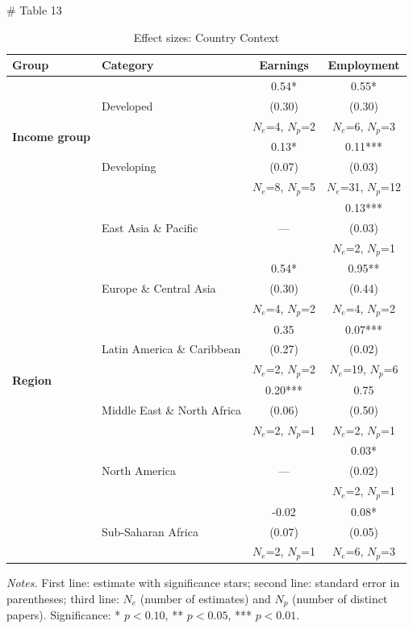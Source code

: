 # Table 13

\renewcommand{\arraystretch}{0.9} %
\setlength{\tabcolsep}{5pt}       %
\small                            %

\begin{table}[htbp]
\centering
\caption{Effect sizes: Country Context}
\medskip
\begin{tabular*}{\linewidth}{@{\extracolsep{\fill}} l l c c @{}}
\toprule
\textbf{Group} & \textbf{Category} & \textbf{Earnings} & \textbf{Employment} \\
\midrule
\multirow{6}{*}{\textbf{Income group}}
  &  & 0.54* & 0.55* \\
  & Developed & (0.30) & (0.30) \\
  &  & $N_e$=4, $N_p$=2 & $N_e$=6, $N_p$=3 \\
\cmidrule(lr){2-4}
  &  & 0.13* & 0.11*** \\
  & Developing & (0.07) & (0.03) \\
  &  & $N_e$=8, $N_p$=5 & $N_e$=31, $N_p$=12 \\
\midrule
\multirow{18}{*}{\textbf{Region}}
  &  &  & 0.13*** \\
  & East Asia \& Pacific & --- & (0.03) \\
  &  &  & $N_e$=2, $N_p$=1 \\
\cmidrule(lr){2-4}
  &  & 0.54* & 0.95** \\
  & Europe \& Central Asia & (0.30) & (0.44) \\
  &  & $N_e$=4, $N_p$=2 & $N_e$=4, $N_p$=2 \\
\cmidrule(lr){2-4}
  &  & 0.35 & 0.07*** \\
  & Latin America \& Caribbean & (0.27) & (0.02) \\
  &  & $N_e$=2, $N_p$=2 & $N_e$=19, $N_p$=6 \\
\cmidrule(lr){2-4}
  &  & 0.20*** & 0.75 \\
  & Middle East \& North Africa & (0.06) & (0.50) \\
  &  & $N_e$=2, $N_p$=1 & $N_e$=2, $N_p$=1 \\
\cmidrule(lr){2-4}
  &  &  & 0.03* \\
  & North America & --- & (0.02) \\
  &  &  & $N_e$=2, $N_p$=1 \\
\cmidrule(lr){2-4}
  &  & -0.02 & 0.08* \\
  & Sub-Saharan Africa & (0.07) & (0.05) \\
  &  & $N_e$=2, $N_p$=1 & $N_e$=6, $N_p$=3 \\
\bottomrule
\end{tabular*}

\vspace{0.3em} %
\parbox{\linewidth}{\scriptsize \textit{Notes.} First line: estimate with significance stars; second line: standard error in parentheses; third line: $N_e$ (number of estimates) and $N_p$ (number of distinct papers). Significance: * $p<0.10$, ** $p<0.05$, *** $p<0.01$.}
\end{table}
